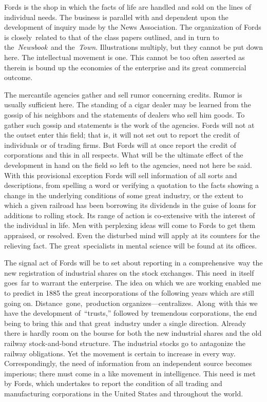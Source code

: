 \documentclass[openany,nobib]{tufte-book}
\begin{document}
Fords is the shop in which the facts of life are handled and sold on the
lines of individual needs. The business is parallel with and dependent
upon the development of inquiry made by the News Association. The
organization of Fords is closely~related to that of the class papers
outlined, and in turn to the~\emph{Newsbook}~and the\emph{~Town}.
Illustrations multiply, but they cannot be put down here. The
intellectual movement is one. This cannot be too often asserted as
therein is bound up the economies of the enterprise and its great
commercial outcome.~

The mercantile agencies gather and sell rumor concerning credits. Rumor
is usually sufficient here. The standing of a cigar dealer may be
learned from the gossip of his neighbors and the statements of dealers
who sell him goods. To gather such gossip and statements is the work of
the agencies. Fords will not at the outset enter this field; that is, it
will not set out to report the credit of individuals or of trading
firms. But Fords will at once report the credit of corporations and this
in all respects. What will be the ultimate effect of the development in
hand on the field so left to the agencies, need not here be said. With
this provisional exception Fords will sell information of all sorts and
descriptions, from spelling a word or verifying a quotation to the facts
showing a change in the underlying conditions of some great industry, or
the extent to which a given railroad has been borrowing its dividends in
the guise of loans for additions to rolling stock. Its range of action
is co-extensive with the interest of the individual in life. Men with
perplexing ideas will come to Fords to get them appraised, or resolved.
Even the disturbed mind will apply at its counters for the relieving
fact. The great~specialists in mental science will be found at its
offices.~

The signal act of Fords will be to set about reporting in a
comprehensive~way the new registration of industrial shares on the stock
exchanges. This need~in itself goes~far to warrant the enterprise. The
idea on which we are working enabled me to predict in 1885 the great
incorporations of the following years which are still going on.
Distance~gone,~production organizes---centralizes.~Along~with this we
have the development of~``trusts,'' followed by tremendous corporations,
the end being to bring this and that great~industry under a single
direction. Already there is hardly room on the bourse for both the new
industrial shares and the old railway stock-and-bond structure. The
industrial stocks go to antagonize the railway obligations. Yet the
movement is certain to increase in every way. Correspondingly, the need
of information from an independent source becomes imperious; there must
come in a like movement in intelligence. This need is met by Fords,
which undertakes to report the condition of all trading and
manufacturing corporations in the United States and throughout the
world.~
\end{document}
